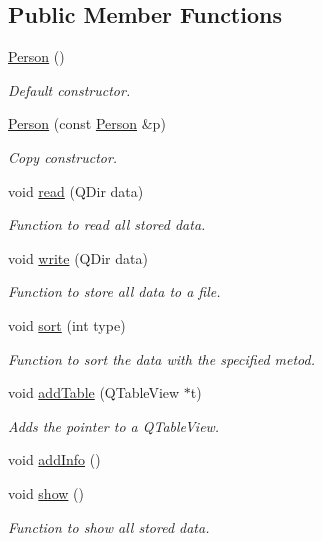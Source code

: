 \subsection*{Public Member Functions}
\begin{DoxyCompactItemize}
\item 
\hyperlink{class_person_a0397c6f89fafc12e738923f612bc41a3}{Person} ()
\begin{DoxyCompactList}\small\item\em Default constructor. \end{DoxyCompactList}\item 
\hyperlink{class_person_a847845e2e214a89e790c584678f1ea97}{Person} (const \hyperlink{class_person}{Person} \&p)
\begin{DoxyCompactList}\small\item\em Copy constructor. \end{DoxyCompactList}\item 
void \hyperlink{class_person_a98c73f33a51b80cc9296a949f2fc5cf3}{read} (Q\+Dir data)
\begin{DoxyCompactList}\small\item\em Function to read all stored data. \end{DoxyCompactList}\item 
void \hyperlink{class_person_aa667ce32c0552e818ac6df14c9a5f50d}{write} (Q\+Dir data)
\begin{DoxyCompactList}\small\item\em Function to store all data to a file. \end{DoxyCompactList}\item 
void \hyperlink{class_person_a602ce88a8ef959c3f4044d9dc00dd2cf}{sort} (int type)
\begin{DoxyCompactList}\small\item\em Function to sort the data with the specified metod. \end{DoxyCompactList}\item 
void \hyperlink{class_person_a100215914f651662a6207722ef28769e}{add\+Table} (Q\+Table\+View $\ast$t)
\begin{DoxyCompactList}\small\item\em Adds the pointer to a Q\+Table\+View. \end{DoxyCompactList}\item 
void \hyperlink{class_person_a1f2447001ce07f9d5d6b1a7a5da29198}{add\+Info} ()
\item 
void \hyperlink{class_person_a2f1231629a6e7e8c83ada57628e80a89}{show} ()
\begin{DoxyCompactList}\small\item\em Function to show all stored data. \end{DoxyCompactList}\end{DoxyCompactItemize}
